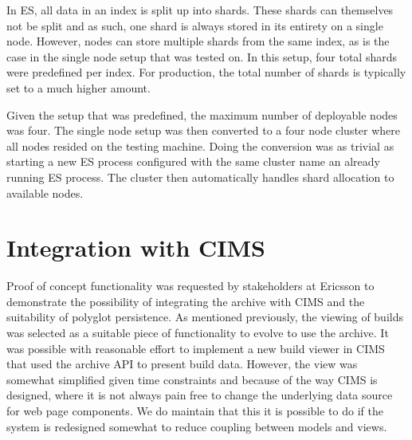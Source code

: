 In ES, all data in an index is split up into shards. These shards can themselves not be split and as such, one shard is always stored in its entirety on a single node. However, nodes can store multiple shards from the same index, as is the case in the single node setup that was tested on. In this setup, four total shards were predefined per index. For production, the total number of shards is typically set to a much higher amount. 

Given the setup that was predefined, the maximum number of deployable nodes was four. The single node setup was then converted to a four node cluster where all nodes resided on the testing machine. Doing the conversion was as trivial as starting a new ES process configured with the same cluster name an already running ES process. The cluster then automatically handles shard allocation to available nodes.


%
%

\section{Integration with CIMS}
Proof of concept functionality was requested by stakeholders at Ericsson to demonstrate the possibility of integrating the archive with CIMS and the suitability of polyglot persistence. As mentioned previously, the viewing of builds was selected as a suitable piece of functionality to evolve to use the archive. It was possible with reasonable effort to implement a new build viewer in CIMS that used the archive API to present build data. However, the view was somewhat simplified given time constraints and because of the way CIMS is designed, where it is not always pain free to change the underlying data source for web page components. We do maintain that this it is possible to do if the system is redesigned somewhat to reduce coupling between models and views.

